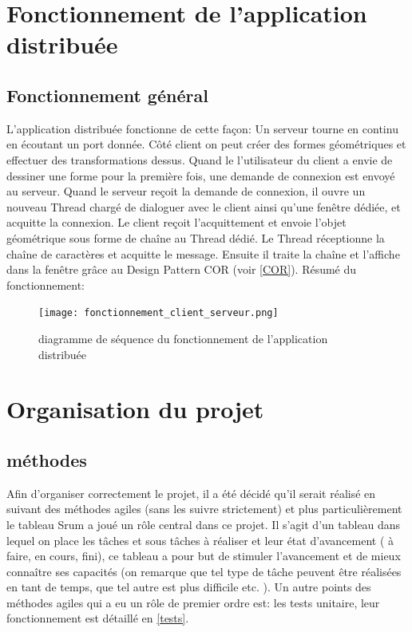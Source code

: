 \documentclass[10pt,a4paper]{report}
\begin{document}
\begin{spacing}{0.8}
\newpage




\part{Fonctionnement de l'application distribuée}
\chapter{Fonctionnement général}
L'application distribuée fonctionne de cette façon: 
Un serveur tourne en continu en écoutant un port donnée.
Côté client on peut créer des formes géométriques et effectuer des transformations dessus.
Quand le l'utilisateur du client a envie de dessiner une forme pour la première fois, une demande de connexion est envoyé au serveur.
Quand le serveur reçoit la demande de connexion, il ouvre un nouveau Thread chargé de dialoguer avec le client ainsi qu'une fenêtre dédiée, et acquitte la connexion.
Le client reçoit l'acquittement et envoie l'objet géométrique sous forme de chaîne au Thread dédié.
Le Thread réceptionne la chaîne de caractères et acquitte le message.
Ensuite il traite la chaîne et l'affiche dans la fenêtre grâce au Design Pattern COR (voir \ref{COR}).
Résumé du fonctionnement:
\begin{figure}[H]
\texttt{[image: fonctionnement\_client\_serveur.png]}
\caption{diagramme de séquence du fonctionnement de l'application distribuée}
\end{figure}



\part{Organisation du projet}

\chapter{méthodes}

Afin d'organiser correctement le projet, il a été décidé qu'il serait réalisé en suivant des méthodes agiles (sans les suivre strictement) et plus particulièrement le tableau Srum a joué un rôle central dans ce projet. Il s'agit d'un tableau dans lequel on place les tâches et sous tâches à réaliser et leur état d'avancement ( à faire, en cours, fini), ce tableau a pour but de stimuler l'avancement et de mieux connaître ses capacités (on remarque que tel type de tâche peuvent être réalisées en tant de temps, que tel autre est plus difficile etc. ). Un autre points des méthodes agiles qui a eu un rôle de premier ordre est: les tests unitaire, leur fonctionnement est détaillé en \ref{tests}.

\end{spacing}
\end{document}
